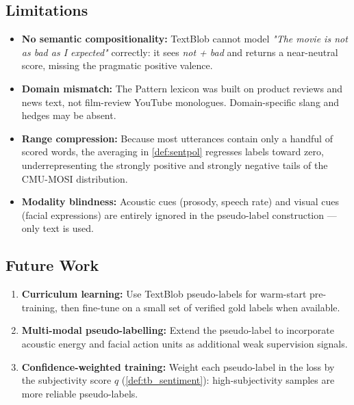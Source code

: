 \documentclass[12pt,a4paper]{article}
\theoremstyle{plain}
\theoremstyle{definition}
\begin{document}
\subsection{Limitations}

\begin{itemize}
  \item \textbf{No semantic compositionality:}
        TextBlob cannot model \emph{"The movie is not as bad as I
        expected"} correctly: it sees \emph{not + bad} and returns a
        near-neutral score, missing the pragmatic positive valence.
  \item \textbf{Domain mismatch:}
        The Pattern lexicon was built on product reviews and news text,
        not film-review YouTube monologues.  Domain-specific slang and
        hedges may be absent.
  \item \textbf{Range compression:}
        Because most utterances contain only a handful of scored words,
        the averaging in \cref{def:sentpol} regresses labels toward
        zero, underrepresenting the strongly positive and strongly
        negative tails of the CMU-MOSI distribution.
  \item \textbf{Modality blindness:}
        Acoustic cues (prosody, speech rate) and visual cues (facial
        expressions) are entirely ignored in the pseudo-label
        construction — only text is used.
\end{itemize}

\subsection{Future Work}

\begin{enumerate}[label=(\arabic*)]
  \item \textbf{Curriculum learning:} Use TextBlob pseudo-labels for
        warm-start pre-training, then fine-tune on a small set of
        verified gold labels when available.
  \item \textbf{Multi-modal pseudo-labelling:} Extend the pseudo-label
        to incorporate acoustic energy and facial action units as
        additional weak supervision signals.
  \item \textbf{Confidence-weighted training:}
        Weight each pseudo-label in the loss by the subjectivity score
        $q$ (\cref{def:tb_sentiment}): high-subjectivity samples are
        more reliable pseudo-labels.
\end{enumerate}
\end{document}
